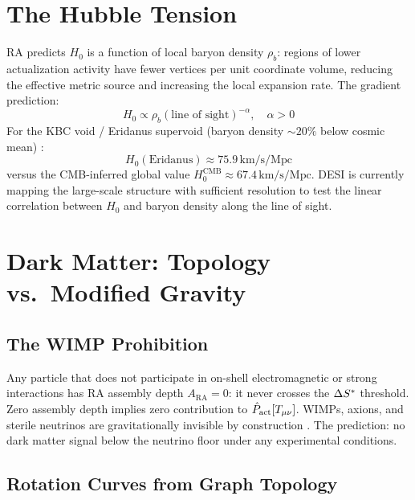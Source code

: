 \documentclass[12pt,a4paper]{article}
\begin{document}
\section{The Hubble Tension}

RA predicts $H_0$ is a function of local baryon density $\rho_b$: regions of lower actualization activity have fewer vertices per unit coordinate volume, reducing the effective metric source and increasing the local expansion rate.  The gradient prediction:
\begin{equation}
  H_0 \propto \rho_b(\text{line of sight})^{-\alpha}, \quad \alpha > 0
\end{equation}
For the KBC void / Eridanus supervoid (baryon density $\sim20\%$ below cosmic mean) \statusCV:
\begin{equation}
  H_0(\text{Eridanus}) \approx 75.9\,\mathrm{km/s/Mpc}
  \label{eq:hubble}
\end{equation}
versus the CMB-inferred global value $H_0^{\mathrm{CMB}} \approx 67.4\,\mathrm{km/s/Mpc}$.  DESI is currently mapping the large-scale structure with sufficient resolution to test the linear correlation between $H_0$ and baryon density along the line of sight.

\section{Dark Matter: Topology vs.\ Modified Gravity}

\subsection{The WIMP Prohibition}

Any particle that does not participate in on-shell electromagnetic or strong interactions has RA assembly depth $A_{\mathrm{RA}} = 0$: it never crosses the $\Delta S^*$ threshold.  Zero assembly depth implies zero contribution to $\hat{P}_{\mathrm{act}}[T_{\mu\nu}]$.  WIMPs, axions, and sterile neutrinos are gravitationally invisible by construction \statusAR.  The prediction: no dark matter signal below the neutrino floor under any experimental conditions.

\subsection{Rotation Curves from Graph Topology}
\end{document}
